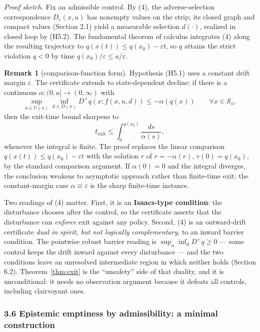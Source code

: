 \documentclass[10pt,twocolumn]{article}
\theoremstyle{definition}
\newtheorem{remark}{Remark}
\begin{document}
\emph{Proof sketch.} Fix an admissible control. By (4), the adverse-selection correspondence \(D_\varepsilon(x,u)\) has nonempty values on the strip; its closed graph and compact values (Section 2.1) yield a measurable selection \(d(\cdot)\), realized in closed loop by (H5.2). The fundamental theorem of calculus integrates (4) along the resulting trajectory to \(q(x(t)) \le q(x_0) - \varepsilon t\), so \(q\) attains the strict violation \(q < 0\) by time \(q(x_0)/\varepsilon \le a/\varepsilon\).

\begin{remark}[comparison-function form]\label{rem:comparison}
Hypothesis (H5.1) uses a constant drift margin \(\varepsilon\). The
certificate extends to state-dependent decline: if there is a continuous
\(\alpha:(0,a]\to(0,\infty)\) with
\[\sup_{u\in U(x)}\inf_{d\in D(x)} D^+q(x; f(x,u,d)) \le -\alpha(q(x)) \qquad \forall x\in\mathcal{S}_a,\]
then the exit-time bound sharpens to
\[t_{\mathrm{exit}} \le \int_0^{q(x_0)} \frac{ds}{\alpha(s)},\]
whenever the integral is finite. The proof replaces the linear comparison
\(q(x(t))\le q(x_0)-\varepsilon t\) with the solution \(r\) of
\(\dot r=-\alpha(r)\), \(r(0)=q(x_0)\), by the standard comparison
argument. If \(\alpha(0)=0\) and the integral diverges, the conclusion
weakens to asymptotic approach rather than finite-time exit; the
constant-margin case \(\alpha\equiv\varepsilon\) is the sharp finite-time
instance.
\end{remark}

Two readings of (4) matter. First, it is an \textbf{Isaacs-type
condition}: the disturbance chooses after the control, so the
certificate asserts that the disturbance can \emph{enforce} exit against
any policy. Second, (4) is an outward-drift certificate \emph{dual in
spirit, but not logically complementary}, to an inward barrier
condition. The pointwise robust barrier reading is
\(\sup_u \inf_d D^+ q \ge 0\) --- some control keeps the drift inward
against every disturbance --- and the two conditions leave an unresolved
intermediate region in which neither holds (Section 6.2). Theorem~\ref{thm:exit} is
the ``unsafety'' side of that duality, and it is unconditional: it needs
no observation argument because it defeats all controls, including
clairvoyant ones.

\subsubsection{3.6 Epistemic emptiness by admissibility: a minimal
construction}\label{epistemic-emptiness-by-admissibility-a-minimal-construction}
\end{document}
